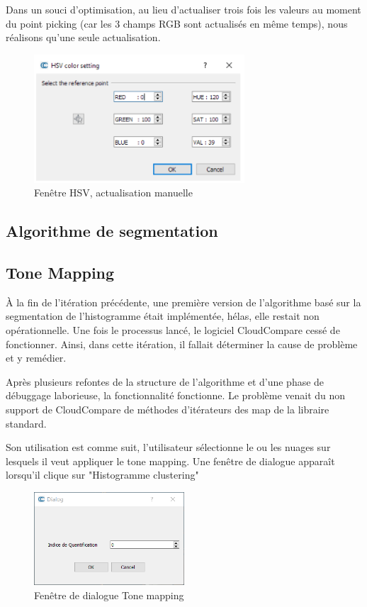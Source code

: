 \documentclass[12pt,titlepage,french]{article}
\begin{document}
Dans un souci d'optimisation, au lieu d'actualiser trois fois les valeurs au moment du point picking (car les 3 champs RGB sont actualisés en même temps), nous réalisons qu'une seule actualisation.

\begin{figure}[H]
 \caption{\label{} Fenêtre HSV, actualisation manuelle}
 \begin{center}
 \includegraphics[width=0.7\textwidth]{./img/hsv.PNG}
  \end{center}
\end{figure}

\subsection{Algorithme de segmentation}

\subsection{Tone Mapping}

À la fin de l'itération précédente, une première version de l'algorithme basé sur la segmentation de l'histogramme était implémentée, hélas, elle restait non opérationnelle. Une fois le processus lancé, le logiciel CloudCompare cessé de fonctionner. Ainsi, dans cette itération, il fallait déterminer la cause de problème et y remédier.

Après plusieurs refontes de la structure de l'algorithme et d'une phase de débuggage laborieuse, la fonctionnalité fonctionne. Le problème venait du non support de CloudCompare de méthodes d'itérateurs des map de la libraire standard.

Son utilisation est comme suit, l'utilisateur sélectionne le ou les nuages sur lesquels il veut appliquer le tone mapping. Une fenêtre de dialogue apparaît lorsqu'il clique sur "Histogramme clustering"

\begin{figure}[H]
 \caption{\label{} Fenêtre de dialogue Tone mapping}
 \begin{center}
 \includegraphics[width=0.5\textwidth]{./img/ToonMappingDialog.PNG}
  \end{center}
\end{figure}
\end{document}
